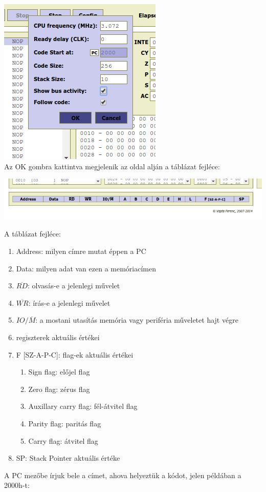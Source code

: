 \documentclass{article}
\begin{document}
\includegraphics[scale=0.5]{sim_lepes3.png} \\
Az OK gombra kattintva megjelenik az oldal alján a táblázat fejléce:

\includegraphics[scale=0.48]{sim_lepes4.png}

A táblázat fejléce:
\begin{enumerate}
	\item Address: milyen címre mutat éppen a PC
	\item Data: milyen adat van ezen a memóriacímen
	\item $\overline{RD}$: olvasás-e a jelenlegi művelet
	\item $\overline{WR}$: írás-e a jelenlegi művelet
	\item $IO/\overline{M}$: a mostani utasítás memória vagy periféria műveletet hajt végre
	\item regiszterek aktuális értékei
	\item F [SZ-A-P-C]: flag-ek aktuális értékei
	\begin{enumerate}
		\item Sign flag: előjel flag
		\item Zero flag: zérus flag
		\item Auxillary carry flag: fél-átvitel flag
		\item Parity flag: paritás flag
		\item Carry flag: átvitel flag
	\end{enumerate}
	\item SP: Stack Pointer aktuális értéke
\end{enumerate}
A PC mezőbe írjuk bele a címet, ahova helyeztük a kódot, jelen példában a 2000h-t:
\end{document}
